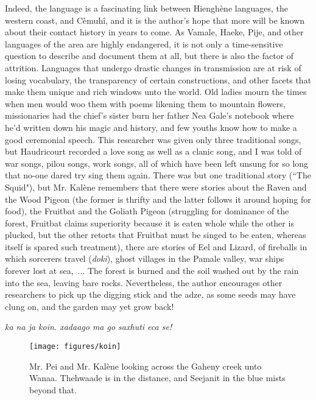 Indeed, the language is a fascinating link between Hienghène languages, the western coast, and Cèmuhî, and it is the author's hope that more will be known about their contact history in years to come. As Vamale, Haeke, Pije, and other languages of the area are highly endangered, it is not only a time-sensitive question to describe and document them at all, but there is also the factor of attrition. Languages that undergo drastic changes in transmission are at risk of losing vocabulary, the transparency of certain constructions, and other facets that make them unique and rich windows unto the world. Old ladies mourn the times when men would woo them with poems likening them to mountain flowers, missionaries had the chief's sister burn her father Nea Gale's notebook where he'd written down his magic and history, and few youths know how to make a good ceremonial speech.
This researcher was given only three traditional songs, but Haudricourt recorded a love song as well as a clanic song, and I was told of war songs, pilou songs, work songs, all of which have been left unsung for so long that no-one dared try sing them again. There was but one traditional story (``The Squid"), but Mr. Kalène remembers that there were stories about the Raven and the Wood Pigeon (the former is thrifty and the latter follows it around hoping for food), the Fruitbat and the Goliath Pigeon (struggling for dominance of the forest, Fruitbat claims superiority because it is eaten whole while the other is plucked, but the other retorts that Fruitbat must be singed to be eaten, whereas itself is spared such treatment), there are stories of Eel and Lizard, of fireballs in which sorcerers travel (\textit{doki}), ghost villages in the Pamale valley, war ships forever lost at sea,~... The forest is burned and the soil washed out by the rain into the sea, leaving bare rocks. Nevertheless, the author encourages other researchers to pick up the digging stick and the adze, as some seeds may have clung on, and the garden may yet grow back!

\begin{center}
\textit{ka na ja koin. xadaago ma go saxhuti eca se!}\\
\end{center}


\begin{figure}
	\texttt{[image: figures/koin]}
	\caption{Mr. Pei and Mr. Kalène looking across the Gaheny creek unto Wanaa. Thehwaade is in the distance, and Seejanit in the blue mists beyond that.}
\end{figure}
